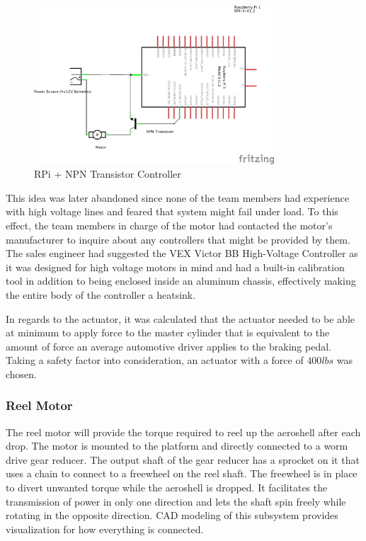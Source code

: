 \begin{figure}[H]
  \centering
  \includegraphics[width=0.8\textwidth]{Controls/rpi_npn_motor_schem.png}
  \caption{\label{fig:rpi_npn_motor} RPi + NPN Transistor Controller}
\end{figure}

This idea was later abandoned since none of the team members had experience with high voltage lines and feared that system might fail under load. To this effect, the team members in charge of the motor had contacted the motor's manufacturer to inquire about any controllers that might be provided by them. The sales engineer had suggested the VEX Victor BB High-Voltage Controller as it was designed for high voltage motors in mind and had a built-in calibration tool in addition to being enclosed inside an aluminum chassis, effectively making the entire body of the controller a heatsink.

In regards to the actuator, it was calculated that the actuator needed to be able at minimum to apply force to the master cylinder that is equivalent to the amount of force an average automotive driver applies to the braking pedal. Taking a safety factor into consideration, an actuator with a force of $400lbs$ was chosen.







\subsubsection{Reel Motor}

\indent\indent The reel motor will provide the torque required to reel up the aeroshell after each drop. The motor is mounted to the platform and directly connected to a worm drive gear reducer. The output shaft of the gear reducer has a sprocket on it that uses a chain to connect to a freewheel on the reel shaft. The freewheel is in place to divert unwanted torque while the aeroshell is dropped. It facilitates the transmission of power in only one direction and lets the shaft spin freely while rotating in the opposite direction. CAD modeling of this subsystem provides visualization for how everything is connected.

